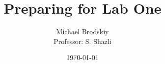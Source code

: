 


\pagestyle{fancy}

\title{Preparing for Lab One}
\date{\today}
\author{Michael Brodskiy\\ \small Professor: S. Shazli}



\maketitle

\thispagestyle{fancy}

\newpage

